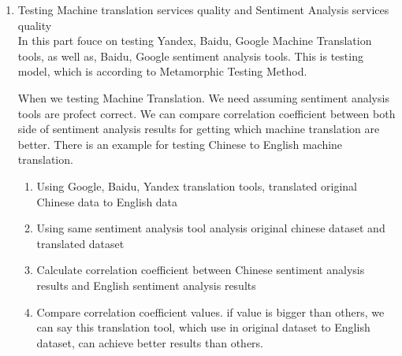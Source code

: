 \documentclass[conference]{IEEEtran}
\begin{document}
\begin{enumerate}
\item Testing Machine translation services quality and Sentiment Analysis
  services quality \\
  In this part fouce on testing Yandex, Baidu, Google Machine Translation tools,
  as well as, Baidu, Google sentiment analysis tools. This is testing model,
  which is according to Metamorphic Testing Method.
  \begin{minipage}[t]{\linewidth}
          \raggedright
          \medskip
  \end{minipage}
When we testing Machine Translation. We need assuming sentiment analysis tools
are profect correct. We can compare correlation coefficient between both side of
sentiment analysis results for getting which machine translation are better.
There is an example for testing Chinese to English machine translation.
\begin{enumerate}
  \item Using Google, Baidu, Yandex translation tools, translated original Chinese data to English data
  \item Using same sentiment analysis tool analysis original chinese dataset and
    translated dataset
  \item Calculate correlation coefficient between Chinese sentiment analysis
    results and English sentiment analysis results
  \item Compare correlation coefficient values. if value is bigger than others,
    we can say this translation tool, which use in original dataset to English
    dataset, can achieve better results than others.

\end{enumerate}
\end{enumerate}
\end{document}
